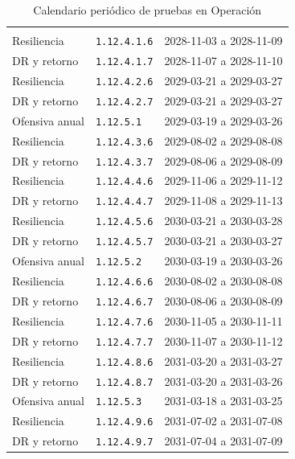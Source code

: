 \begin{longtable}{L{.22\textwidth}L{.27\textwidth}L{.41\textwidth}}
\caption{Calendario periódico de pruebas en Operación}\label{tab:t13-periodico}\\\hline
{} &  & \\\hline\endfirsthead
\hline{} &  & \\\hline\endhead
Resiliencia & \texttt{1.12.4.1.6} & 2028-11-03 a 2028-11-09\\\hline
DR y retorno & \texttt{1.12.4.1.7} & 2028-11-07 a 2028-11-10\\\hline
Resiliencia & \texttt{1.12.4.2.6} & 2029-03-21 a 2029-03-27\\\hline
DR y retorno & \texttt{1.12.4.2.7} & 2029-03-21 a 2029-03-27\\\hline
Ofensiva anual & \texttt{1.12.5.1} & 2029-03-19 a 2029-03-26\\\hline
Resiliencia & \texttt{1.12.4.3.6} & 2029-08-02 a 2029-08-08\\\hline
DR y retorno & \texttt{1.12.4.3.7} & 2029-08-06 a 2029-08-09\\\hline
Resiliencia & \texttt{1.12.4.4.6} & 2029-11-06 a 2029-11-12\\\hline
DR y retorno & \texttt{1.12.4.4.7} & 2029-11-08 a 2029-11-13\\\hline
Resiliencia & \texttt{1.12.4.5.6} & 2030-03-21 a 2030-03-28\\\hline
DR y retorno & \texttt{1.12.4.5.7} & 2030-03-21 a 2030-03-27\\\hline
Ofensiva anual & \texttt{1.12.5.2} & 2030-03-19 a 2030-03-26\\\hline
Resiliencia & \texttt{1.12.4.6.6} & 2030-08-02 a 2030-08-08\\\hline
DR y retorno & \texttt{1.12.4.6.7} & 2030-08-06 a 2030-08-09\\\hline
Resiliencia & \texttt{1.12.4.7.6} & 2030-11-05 a 2030-11-11\\\hline
DR y retorno & \texttt{1.12.4.7.7} & 2030-11-07 a 2030-11-12\\\hline
Resiliencia & \texttt{1.12.4.8.6} & 2031-03-20 a 2031-03-27\\\hline
DR y retorno & \texttt{1.12.4.8.7} & 2031-03-20 a 2031-03-26\\\hline
Ofensiva anual & \texttt{1.12.5.3} & 2031-03-18 a 2031-03-25\\\hline
Resiliencia & \texttt{1.12.4.9.6} & 2031-07-02 a 2031-07-08\\\hline
DR y retorno & \texttt{1.12.4.9.7} & 2031-07-04 a 2031-07-09\\\hline
\end{longtable}
